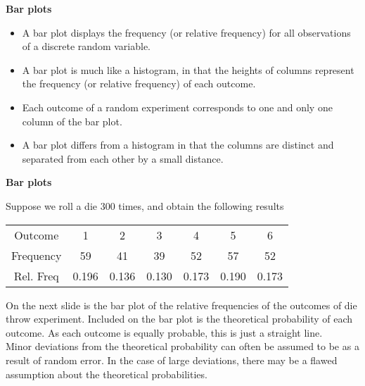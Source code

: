 \documentclass[]{report}
\begin{document}
{
\textbf{Bar plots}

\begin{itemize} \item  A bar plot displays the frequency (or relative frequency) for all observations of a discrete random variable. \item  A bar plot is much like a histogram, in that the heights of columns represent the frequency (or relative frequency) of each outcome.
\item  Each outcome of a random experiment corresponds to one and only one column of the bar plot.
\item  A bar plot differs from a histogram in that the columns are distinct and separated from each other by a small distance.
\end{itemize}
}
{
\textbf{Bar plots}

Suppose we roll a die 300 times, and obtain the following results

\begin{center}
\begin{tabular}{|c|c|c|c|c|c|c|}
\hline

Outcome & 1 & 2 & 3 & 4 & 5 & 6 \\
Frequency & 59 &41 &39 &52 &57 &52  \\
Rel. Freq & 0.196 & 0.136 & 0.130 & 0.173 & 0.190 & 0.173\\
\hline
\end{tabular}
\end{center}

On the next slide is the bar plot of the relative frequencies of the outcomes of die throw experiment.
Included on the bar plot is the theoretical probability of each outcome. As each outcome is equally probable, this is just a straight line.\\ \bigskip
Minor deviations from the theoretical probability can often be assumed to be as a result of random error. In the case of large deviations, there may be a flawed assumption about the theoretical probabilities.
}

\end{document}
